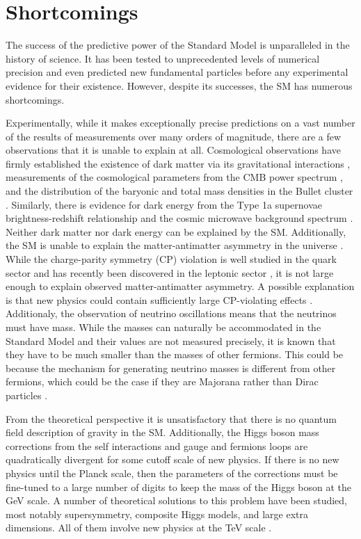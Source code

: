 \section{Shortcomings}

The success
of the predictive power of the Standard Model is unparalleled in the history of science.
It has been tested to unprecedented levels of numerical precision and even predicted new
fundamental particles before any experimental evidence for their existence. However,
despite its successes, the SM has numerous shortcomings.

Experimentally, while it makes exceptionally
precise predictions on a vast number of the results of measurements over many orders
of magnitude, there are a few observations that it is unable to explain at all.
Cosmological observations have firmly established the existence of dark matter via its
gravitational interactions \cite{Zwicky2008, rotation}, measurements of the
cosmological parameters from the CMB power spectrum \cite{Ade:2015}, and the
distribution of the baryonic and total mass densities in the Bullet cluster
\cite{Clowe:2006}. Similarly, there is evidence for dark energy
from the Type 1a supernovae brightness-redshift relationship
\cite{Knop:2003iy} and the cosmic microwave background spectrum \cite{Ade:2015}.
Neither dark matter nor dark energy can be explained by the SM.
Additionally, the SM is unable to explain the matter-antimatter asymmetry in
the universe \cite{sarkar2007particle}. While the charge-parity symmetry (CP)
violation is well studied in the quark sector and has recently been discovered in the
leptonic sector \cite{Abe:2019vii}, it is not large enough to explain observed
matter-antimatter asymmetry. A possible explanation is that new physics
could contain sufficiently large CP-violating effects \cite{Thomson:2013zua}.
Additionaly, the observation of neutrino oscillations means that the neutrinos
must have mass. While the masses can naturally be accommodated in the Standard Model
and their values are not measured precisely, it is known that they have to be much
smaller than the masses of other fermions. This could be because the mechanism
for generating neutrino masses is different from other fermions, which could be the
case if they are Majorana rather than Dirac particles \cite{Thomson:2013zua}.

From the theoretical perspective it is unsatisfactory that there is no quantum
field description of gravity in the SM. Additionally, the Higgs boson mass
corrections from the self interactions and gauge and fermions loops are
quadratically divergent for some cutoff scale of new physics. If there is no new
physics until the Planck scale, then the parameters of the corrections must be
fine-tuned to a large number of digits to keep the mass of the Higgs boson
at the GeV scale. A number of theoretical solutions to this problem have been
studied, most notably supersymmetry, composite Higgs models, and large extra
dimensions. All of them involve new physics at the TeV scale \cite{Schwartz:2013pla}.

